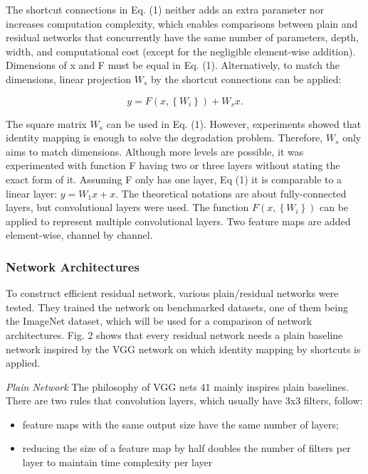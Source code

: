 \documentclass[
]{krantz}
\providecommand{\tightlist}{%
  \setlength{\itemsep}{0pt}\setlength{\parskip}{0pt}}
\begin{document}
The shortcut connections in Eq. (1) neither adds an extra parameter nor increases computation complexity, which enables comparisons between plain and residual networks that concurrently have the same number of parameters, depth, width, and computational cost (except for the negligible element-wise addition).
Dimensions of x and F must be equal in Eq. (1). Alternatively, to match the dimensions, linear projection \(W_s\) by the shortcut connections can be applied:

\begin{equation}
\tag{2}
y = F  \left( x,\left\{  W_i\right\} \right)+ W_sx.
\end{equation}

The square matrix \(W_s\) can be used in Eq. (1). However, experiments showed that identity mapping is enough to solve the degradation problem. Therefore, \(W_s\) only aims to match dimensions. Although more levels are possible, it was experimented with function F having two or three layers without stating the exact form of it. Assuming F only has one layer, Eq (1) it is comparable to a linear layer: \(y = W_1 x + x\). The theoretical notations are about fully-connected layers, but convolutional layers were used. The function \(F \left( x,\left\{ W_i\right\} \right)\) can be applied to represent multiple convolutional layers. Two feature maps are added element-wise, channel by channel.

\hypertarget{network-architectures}{%
\subsubsection{Network Architectures}\label{network-architectures}}

To construct efficient residual network, various plain/residual networks were tested. They trained the network on benchmarked datasets, one of them being the ImageNet dataset, which will be used for a comparison of network architectures. Fig. 2 shows that every residual network needs a plain baseline network inspired by the VGG network \citet{vgg} on which identity mapping by shortcuts is applied.

\emph{Plain Network} The philosophy of VGG nets 41 mainly inspires plain baselines. There are two rules that convolution layers, which usually have 3x3 filters, follow:

\begin{itemize}
\tightlist
\item
  feature maps with the same output size have the same number of layers;
\item
  reducing the size of a feature map by half doubles the number of filters per layer to maintain time complexity per layer
\end{itemize}
\end{document}

